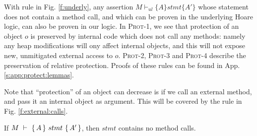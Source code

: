 With rule {} in Fig. \ref{f:underly},  any assertion $M \vdash_{ul} \{ A \} stmt \{ A' \}$  whose statement does not contain a method call, and which 
can be proven in the underlying Hoare logic, can also be proven in our logic. %
In \textsc{Prot-1}, we see that  protection of an object $o$ is preserved by internal code which does not call any methods: namely any heap modifications will
ony affect internal objects, and this will not expose new, unmitigated external access to $o$.
 \textsc{Prot-2}, \textsc{Prot-3} and \textsc{Prot-4} describe the preservation of relative protection.
Proofs of these rules can be found in App. \ref{s:app:protect:lemmas}. 

Note that ``protection'' of an object can decrease is if we call an external method, and pass it %
an internal object 
 as argument. This will be  covered by the rule in Fig. \ref{f:external:calls}.



\begin{lemma}
\label{l:no:meth:calls}
If ${M\ \vdash\ \{\,A\, \} \ stmt\  \{\,A'\, \} }$, then $stmt$ contains no method calls.
\end{lemma}
  


